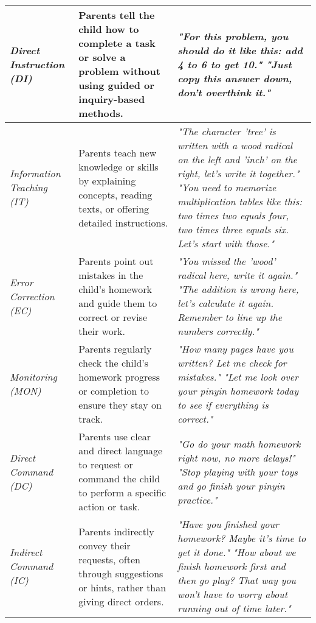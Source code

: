 \begin{table}
\begin{tabular}{p{} p{} p{}}
\textit{Direct \newline Instruction (DI)} & Parents tell the child how to complete a task or solve a problem without using guided or inquiry-based methods. & \textit{"For this problem, you should do it like this: add 4 to 6 to get 10."} \newline \textit{"Just copy this answer down, don't overthink it."} \\ \hline
\textit{Information \newline Teaching (IT)} & Parents teach new knowledge or skills by explaining concepts, reading texts, or offering detailed instructions. & \textit{"The character 'tree' is written with a wood radical on the left and 'inch' on the right, let's write it together."} \newline \textit{"You need to memorize multiplication tables like this: two times two equals four, two times three equals six. Let's start with those."} \\ \hline
\textit{Error Correction (EC)} & Parents point out mistakes in the child's homework and guide them to correct or revise their work. & \textit{"You missed the 'wood' radical here, write it again."} \newline \textit{"The addition is wrong here, let's calculate it again. Remember to line up the numbers correctly."} \\ \hline
\textit{Monitoring (MON)} & Parents regularly check the child's homework progress or completion to ensure they stay on track. & \textit{"How many pages have you written? Let me check for mistakes."} \newline \textit{"Let me look over your pinyin homework today to see if everything is correct."} \\ \hline
\textit{Direct Command (DC)} & Parents use clear and direct language to request or command the child to perform a specific action or task. & \textit{"Go do your math homework right now, no more delays!"} \newline \textit{"Stop playing with your toys and go finish your pinyin practice."} \\ \hline
\textit{Indirect Command (IC)} & Parents indirectly convey their requests, often through suggestions or hints, rather than giving direct orders. & \textit{"Have you finished your homework? Maybe it's time to get it done."} \newline \textit{"How about we finish homework first and then go play? That way you won't have to worry about running out of time later."} \\ \midrule


\end{tabular}
\end{table}

